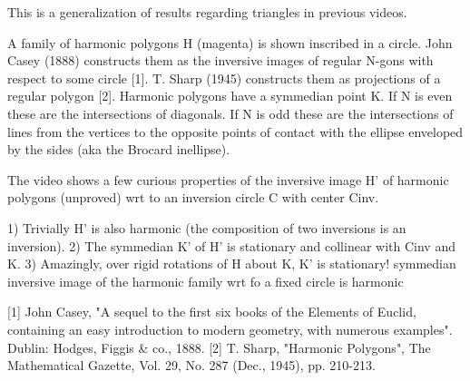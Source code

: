 This is a generalization of results regarding triangles in previous videos.

A family of harmonic polygons H (magenta) is shown inscribed in a circle. John Casey (1888) constructs them as the inversive images of regular N-gons with respect to some circle [1]. T. Sharp (1945) constructs them as projections of a regular polygon [2].  Harmonic polygons have a symmedian point K. If N is even these are the intersections of diagonals. If N is odd these are the intersections of lines from the vertices to the opposite points of contact with the ellipse enveloped by the sides (aka the Brocard inellipse).

The video shows a few curious properties of the inversive image H' of harmonic polygons (unproved) wrt to an inversion circle C with center Cinv.

1) Trivially H' is also harmonic (the composition of two inversions is an inversion).
2) The symmedian K' of H' is stationary and collinear with Cinv and K.
3) Amazingly, over rigid rotations of H about K, K' is stationary!
symmedian inversive image of the harmonic family wrt fo a fixed circle is harmonic

[1] John Casey, "A sequel to the first six books of the Elements of Euclid, containing an easy introduction to modern geometry, with numerous examples". Dublin: Hodges, Figgis & co., 1888.
[2] T. Sharp, "Harmonic Polygons", The Mathematical Gazette, Vol. 29, No. 287 (Dec., 1945), pp. 210-213.